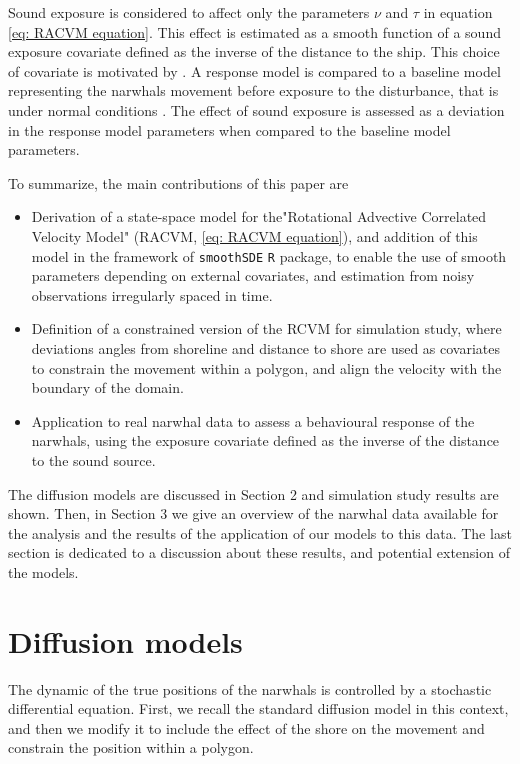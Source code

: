 \documentclass[11pt]{article}
\newcommand {\1}{\mathbb{1}}
\begin{document}
Sound exposure is considered to affect only the parameters $\nu$ and $\tau$ in equation \ref{eq: RACVM equation}. This effect is estimated as a smooth function of a sound exposure covariate defined as the inverse of the distance to the ship. This choice of covariate is motivated by \cite{heide-jorgensen_behavioral_2021}. A response model is compared to a baseline model representing the narwhals movement before exposure to the disturbance, that is under normal conditions \cite{michelot_continuous-time_2022}.
The effect of sound exposure is assessed as a deviation in the response model parameters when compared to the baseline model parameters.



To summarize, the main contributions of this paper are
\begin{itemize}
	\item Derivation of a state-space model for the"Rotational Advective Correlated Velocity Model" (RACVM, \ref{eq: RACVM equation}), and addition of this model in the framework of \texttt{smoothSDE} \texttt{R} package, to enable the use of smooth parameters depending on external covariates, and estimation from noisy observations irregularly spaced in time.
	\item Definition of a constrained version of the RCVM for simulation study, where deviations angles from shoreline and distance to shore are used as covariates to constrain the movement within a polygon, and align the velocity with the boundary of the domain.
	\item Application to real narwhal data to assess a behavioural response of the narwhals, using the exposure covariate defined as the inverse of the distance to the sound source.
\end{itemize}

The diffusion models are discussed in Section 2 and simulation study results are shown.
Then,  in Section 3 we give an overview of the narwhal data available for the analysis and the results of the application of our models to this data. The last section is dedicated to a discussion about these results, and potential extension of the models.


\section{Diffusion models}

The dynamic of the true positions of the narwhals is controlled by a stochastic differential equation. First, we recall the standard diffusion model in this context, and then we modify it to include the effect of the shore on the movement and constrain the position within a polygon.
\end{document}

